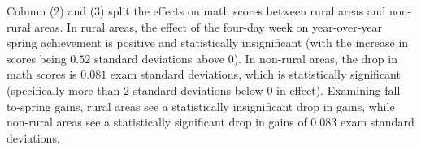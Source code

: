 \documentclass[10pt]{extarticle}
\begin{document}
  Column (2) and (3) split the effects on math scores between rural areas and non-rural areas. In rural areas, the effect of the four-day week on year-over-year spring achievement is positive and statistically insignificant (with the increase in scores being $0.52$ standard deviations above $0$). In non-rural areas, the drop in math scores is $0.081$ exam standard deviations, which is statistically significant (specifically more than $2$ standard deviations below $0$ in effect). Examining fall-to-spring gains, rural areas see a statistically insignificant drop in gains, while non-rural areas see a statistically significant drop in gains of $0.083$ exam standard deviations.
\end{document}
